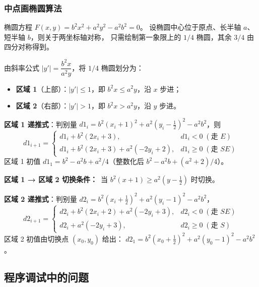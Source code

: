 \documentclass[a4paper,12pt]{ctexart}
\begin{document}
\subsubsection{中点画椭圆算法}

椭圆方程 $F(x,y)=b^2 x^2 + a^2 y^2 - a^2 b^2 = 0$。
设椭圆中心位于原点、长半轴 $a$、短半轴 $b$，则关于两坐标轴对称，
只需绘制第一象限上的 $1/4$ 椭圆，其余 $3/4$ 由四分对称得到。

由斜率公式 $|y'|=\dfrac{b^2 x}{a^2 y}$，将 $1/4$ 椭圆划分为：
\begin{itemize}[leftmargin=2em,itemsep=0.1em]
    \item \textbf{区域 1}（上部）：$|y'|\le 1$，即 $b^2 x \le a^2 y$，沿 $x$ 步进；
    \item \textbf{区域 2}（右部）：$|y'|>1$，即 $b^2 x > a^2 y$，沿 $y$ 步进。
\end{itemize}

\textbf{区域 1 递推式}：判别量
$d1_i = b^2(x_i+1)^2 + a^2(y_i-\tfrac{1}{2})^2 - a^2 b^2$，则
\[
    d1_{i+1}=
    \begin{cases}
        d1_i + b^2(2x_i+3),                  & d1_i<0\;(\text{走 } E) \\
        d1_i + b^2(2x_i+3) + a^2(-2y_i+2),   & d1_i\ge 0\;(\text{走 } SE)
    \end{cases}
\]
区域 1 初值 $d1_1 = b^2 - a^2 b + a^2/4$（整数化后 $b^2 - a^2 b + (a^2+2)/4$）。

\textbf{区域 1 → 区域 2 切换条件：}\ 当 $b^2(x+1) \ge a^2(y-\tfrac{1}{2})$ 时切换。

\textbf{区域 2 递推式}：判别量
$d2_i = b^2(x_i+\tfrac{1}{2})^2 + a^2(y_i-1)^2 - a^2 b^2$，
\[
    d2_{i+1}=
    \begin{cases}
        d2_i + b^2(2x_i+2) + a^2(-2y_i+3),   & d2_i<0\;(\text{走 } SE) \\
        d2_i + a^2(-2y_i+3),                 & d2_i\ge 0\;(\text{走 } S)
    \end{cases}
\]
区域 2 初值由切换点 $(x_0,y_0)$ 给出：
$d2_1 = b^2(x_0+\tfrac{1}{2})^2 + a^2(y_0-1)^2 - a^2 b^2$。

\subsection{程序调试中的问题}
\end{document}
